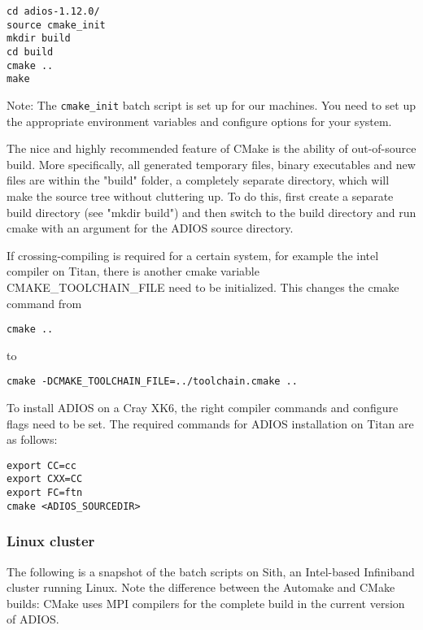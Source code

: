 \begin{lstlisting}
cd adios-1.12.0/
source cmake_init
mkdir build
cd build
cmake ..
make
\end{lstlisting}

Note: The \verb+cmake_init+ batch script is set up for our machines. You need to
set up the appropriate environment variables and configure options for your system.

The nice and highly recommended feature of CMake is the ability of out-of-source build.
More specifically, all generated temporary files, binary executables and new files are within
the "build" folder, a completely separate directory, which will make the source tree without cluttering up. To do this,
first create a separate build directory (see "mkdir build")
and then switch to the build directory and run cmake with an argument for the ADIOS source directory.

If crossing-compiling is required for a certain system, for example the intel compiler on Titan,
there is another cmake variable CMAKE\_TOOLCHAIN\_FILE need to be initialized. This changes the cmake
command from

\begin{lstlisting}
cmake ..
\end{lstlisting}
to
\begin{lstlisting}
cmake -DCMAKE_TOOLCHAIN_FILE=../toolchain.cmake ..
\end{lstlisting}

To install ADIOS on a Cray XK6, the right compiler commands and configure flags
need to be set. The required commands for ADIOS installation on Titan are as follows:

\begin{lstlisting}
export CC=cc
export CXX=CC
export FC=ftn
cmake <ADIOS_SOURCEDIR>
\end{lstlisting}


\subsubsection{Linux cluster}

The following is a snapshot of the batch scripts on Sith, an Intel-based Infiniband
cluster running Linux. Note the difference between the Automake and CMake builds:
CMake uses MPI compilers for the complete build in the current version of ADIOS.


